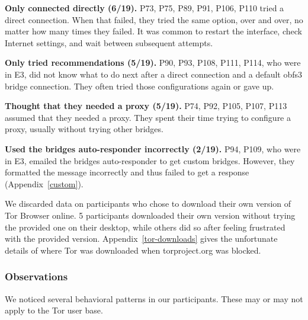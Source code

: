 \documentclass[USenglish,oneside,twocolumn]{article}
\begin{document}
\begin{description}
\item {\bfseries Only connected directly (6/19).} P73, P75, P89, P91, P106, P110 tried a direct connection. When that failed, they tried the same option, over and over, no matter how many times they failed. It was common to restart the interface, check Internet settings, and wait between subsequent attempts.

\item {\bfseries Only tried recommendations (5/19).} P90, P93, P108, P111, P114, who were in E3, did not know what to do next after a direct connection and a default obfs3 bridge connection. They often tried those configurations again or gave up. 

\item {\bfseries Thought that they needed a proxy (5/19).} P74, P92, P105, P107, P113 assumed that they needed a proxy. They spent their time trying to configure a proxy, usually without trying other bridges. 

\item {\bfseries Used the bridges auto-responder incorrectly (2/19).} P94, P109, who were in E3, emailed the bridges auto-responder to get custom bridges. However, they formatted the message incorrectly and thus failed to get a response (Appendix~\ref{custom}).
\end{description}

We discarded data on participants who chose to download their own version of Tor Browser online. 5 participants downloaded their own version without trying the provided one on their desktop, while others did so after feeling frustrated with the provided version. Appendix~\ref{tor-downloads} gives the unfortunate details of where Tor was downloaded when torproject.org was blocked.


\subsubsection{Observations}
We noticed several behavioral patterns in our participants. These may or may not apply to the Tor user base.\\
\end{document}
